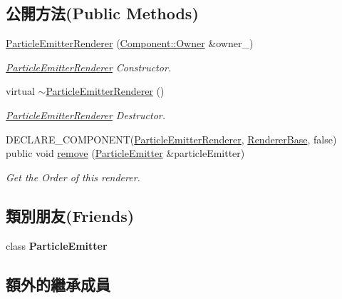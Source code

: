 \subsection*{公開方法(Public Methods)}
\begin{DoxyCompactItemize}
\item 
\hyperlink{class_magnum_1_1_particle_emitter_renderer_a58ee2eabce19408a2020f905b4a771f4}{Particle\+Emitter\+Renderer} (\hyperlink{class_magnum_1_1_component_1_1_owner}{Component\+::\+Owner} \&owner\+\_\+)
\begin{DoxyCompactList}\small\item\em \hyperlink{class_magnum_1_1_particle_emitter_renderer}{Particle\+Emitter\+Renderer} Constructor. \end{DoxyCompactList}\item 
virtual \hyperlink{class_magnum_1_1_particle_emitter_renderer_a3c6a4130f20d9e875c6c024ef8adf980}{$\sim$\+Particle\+Emitter\+Renderer} ()
\begin{DoxyCompactList}\small\item\em \hyperlink{class_magnum_1_1_particle_emitter_renderer}{Particle\+Emitter\+Renderer} Destructor. \end{DoxyCompactList}\item 
D\+E\+C\+L\+A\+R\+E\+\_\+\+C\+O\+M\+P\+O\+N\+E\+NT(\hyperlink{class_magnum_1_1_particle_emitter_renderer}{Particle\+Emitter\+Renderer}, \hyperlink{class_magnum_1_1_renderer_base}{Renderer\+Base}, false) public void \hyperlink{class_magnum_1_1_particle_emitter_renderer_a1c48314c5386716962d6859e4c546ef1}{remove} (\hyperlink{class_magnum_1_1_particle_emitter}{Particle\+Emitter} \&particle\+Emitter)
\begin{DoxyCompactList}\small\item\em Get the Order of this renderer. \end{DoxyCompactList}\end{DoxyCompactItemize}
\subsection*{類別朋友(Friends)}
\begin{DoxyCompactItemize}
\item 
class {\bfseries Particle\+Emitter}\hypertarget{class_magnum_1_1_particle_emitter_renderer_a82b374d797a09668286ac5cf26f539f3}{}\label{class_magnum_1_1_particle_emitter_renderer_a82b374d797a09668286ac5cf26f539f3}

\end{DoxyCompactItemize}
\subsection*{額外的繼承成員}



